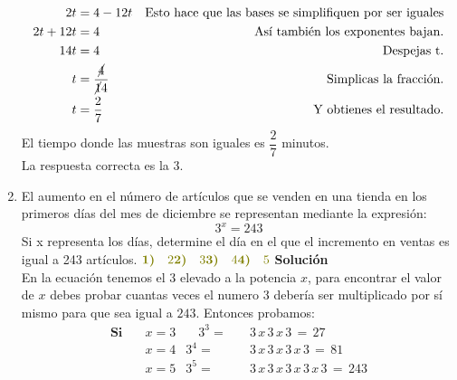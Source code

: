\documentclass[11pt, a4paper]{article} %
\theoremstyle{dotlessP}
\theoremstyle{dotlessS}
\begin{document}
\begin{enumerate}[label=\color{dg}\theenumi.]
\begin{align*}
\\
2t  &= 4 - 12t &\text{Esto hace que las bases se simplifiquen por ser iguales}  
\\
2t +  12t&= 4 &\text{Así también los exponentes bajan.}  
\\
14t&= 4  &\text{Despejas t.}  
\\
t &= \displaystyle\frac{\cancel 4}{\cancel 14} &\text{Simplicas la fracción.}  
\\
t &= \dfrac{2}{7} &\text{Y obtienes el resultado.}  
\end{align*}
El tiempo donde las muestras son iguales es $\dfrac{2}{7}$ minutos.
\\
{\color{dh} La respuesta correcta es la 3.}
\\
\item {\color{db} El aumento en el número de artículos que se venden en una tienda en los primeros días del mes de diciembre se representan mediante la expresión: 
\[
3^x = 243
\]
Si x representa los días, determine el día en el que el incremento en ventas es igual a 243 artículos.}
        \(
\vspace{1\baselineskip} \\ 	
     {\color{dh} \textbf{1)} \quad 2} \vspace{1\baselineskip} \\ 	
     {\color{dh} \textbf{2)} \quad 3} \vspace{1\baselineskip} \\ 	
     {\color{dh} \textbf{3)} \quad 4} \vspace{1\baselineskip} \\ 	
     {\color{dh} \textbf{4)} \quad 5}   \vspace{1\baselineskip} \\ 	
      \)
        \textbf{Solución} \\
En la ecuación tenemos el 3 elevado a la potencia \( x \), para encontrar el valor de \( x \) debes probar cuantas veces el numero 3 debería ser multiplicado por sí mismo para que sea igual a \( 243\).
Entonces probamos:
\begin{align*}
\textbf{Si} \quad & x = 3 &\quad 3^3 = &\quad 3\, x\, 3\, x\, 3\, =\, 27 \\
            & x = 4 & 3^4 = &\quad 3\, x\, 3\, x\, 3\, x\, 3\, =\, 81\\
            & x = 5 & 3^5 = &\quad 3\, x\, 3\, x\, 3\, x\, 3\, x\, 3\, =\, 243 
\end{align*}


\end{enumerate}
\end{document}
